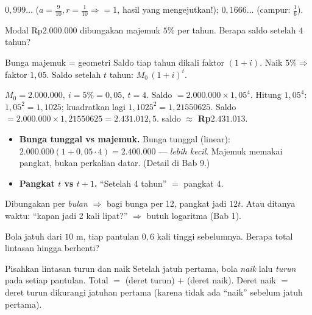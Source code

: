 \begin{variasi}
$0{,}999\ldots$ ($a=\frac{9}{10},r=\frac{1}{10}\Rightarrow=1$, hasil yang
mengejutkan!); $0{,}1666\ldots$ (campur: $\frac16$).
\end{variasi}

\begin{soalbox}{}
Modal Rp$2.000.000$ dibungakan majemuk $5\%$ per tahun. Berapa saldo setelah $4$
tahun?
\end{soalbox}

\begin{ingat}{Bunga majemuk = geometri}
Saldo tiap tahun dikali faktor $(1+i)$. Naik $5\%\Rightarrow$ faktor $1{,}05$.
Saldo setelah $t$ tahun: $M_0\,(1+i)^t$.
\end{ingat}

\jawab
{} $M_0=2.000.000,\ i=5\%=0{,}05,\ t=4$.
 Saldo $=2.000.000\times1{,}05^{4}$.
 Hitung $1{,}05^4$: $1{,}05^2=1{,}1025$; kuadratkan lagi
$1{,}1025^2=1{,}21550625$.
 Saldo $=2.000.000\times1{,}21550625=2.431.012{,}5$.
\jadi saldo $\approx$ \textbf{Rp$2.431.013$}.

\begin{jebakan}
\begin{itemize}[leftmargin=*,topsep=2pt]
  \item \textbf{Bunga tunggal vs majemuk.} Bunga tunggal (linear):
  $2.000.000(1+0{,}05\cdot4)=2.400.000$ --- \emph{lebih kecil}. Majemuk memakai
  pangkat, bukan perkalian datar. (Detail di Bab 9.)
  \item \textbf{Pangkat $t$ vs $t+1$.} ``Setelah 4 tahun'' $=$ pangkat $4$.
\end{itemize}
\end{jebakan}

\begin{variasi}
Dibungakan per \emph{bulan} $\Rightarrow$ bagi bunga per 12, pangkat jadi
$12t$. Atau ditanya waktu: ``kapan jadi 2 kali lipat?'' $\Rightarrow$ butuh
logaritma (Bab 1).
\end{variasi}

\begin{soalbox}{}
Bola jatuh dari $10$ m, tiap pantulan $0{,}6$ kali tinggi sebelumnya. Berapa
total lintasan hingga berhenti?
\end{soalbox}

\begin{ingat}{Pisahkan lintasan turun dan naik}
Setelah jatuh pertama, bola \emph{naik} lalu \emph{turun} pada setiap pantulan.
Total $=$ (deret turun) $+$ (deret naik). Deret naik $=$ deret turun dikurangi
jatuhan pertama (karena tidak ada ``naik'' sebelum jatuh pertama).
\end{ingat}

